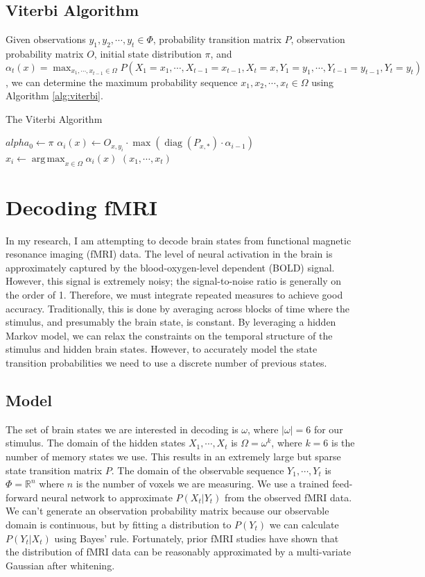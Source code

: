 \documentclass{article}
\DeclareMathOperator*{\argmax}{arg\,max}
\DeclareMathOperator{\diag}{diag}
\begin{document}
\subsection{Viterbi Algorithm}
Given observations $y_1, y_2, \cdots, y_t \in \Phi$, probability transition matrix $P$, observation probability matrix $O$, initial state distribution $\pi$, and $\alpha_t(x) = \max_{x_1, \cdots, x_{t-1} \in \Omega}P(X_1 = x_1, \cdots, X_{t-1} = x_{t-1}, X_t = x, Y_1 = y_1, \cdots, Y_{t-1} = y_{t-1}, Y_t = y_t)$, we can determine the maximum probability sequence $x_1, x_2, \cdots, x_t \in \Omega$ using Algorithm \ref{alg:viterbi}.
\begin{algorithm}
\caption{The Viterbi Algorithm}
\label{alg:viterbi}
\begin{algorithmic}
\STATE $alpha_0 \leftarrow \pi$
\STATE $\alpha_i(x) \leftarrow O_{x,y_i} \cdot \max{\left( \diag(P_{x,*}) \cdot \alpha_{i-1} \right)}$
\ENDFOR
\STATE $x_i \leftarrow \argmax_{x \in \Omega}{\alpha_i(x)}$
\ENDFOR
\RETURN $(x_1, \cdots, x_t)$
\end{algorithmic}
\end{algorithm}

\section{Decoding fMRI}
In my research, I am attempting to decode brain states from functional magnetic resonance imaging (fMRI) data.
The level of neural activation in the brain is approximately captured by the blood-oxygen-level dependent (BOLD) signal.
However, this signal is extremely noisy; the signal-to-noise ratio is generally on the order of 1.
Therefore, we must integrate repeated measures to achieve good accuracy.
Traditionally, this is done by averaging across blocks of time where the stimulus, and presumably the brain state, is constant.
By leveraging a hidden Markov model, we can relax the constraints on the temporal structure of the stimulus and hidden brain states.
However, to accurately model the state transition probabilities we need to use a discrete number of previous states.

\subsection{Model}
The set of brain states we are interested in decoding is $\omega$, where $|\omega| = 6$ for our stimulus.
The domain of the hidden states $X_1, \cdots, X_t$ is $\Omega = \omega^k$, where $k = 6$ is the number of memory states we use.
This results in an extremely large but sparse state transition matrix $P$.
The domain of the observable sequence $Y_1, \cdots, Y_t$ is $\Phi = \mathbb{R}^n$ where $n$ is the number of voxels we are measuring.
We use a trained feed-forward neural network to approximate $P(X_t | Y_t)$ from the observed fMRI data.
We can't generate an observation probability matrix because our observable domain is continuous, but by fitting a distribution to $P(Y_t)$ we can calculate $P(Y_t | X_t)$ using Bayes' rule.
Fortunately, prior fMRI studies have shown that the distribution of fMRI data can be reasonably approximated by a multi-variate Gaussian after whitening.
\end{document}
